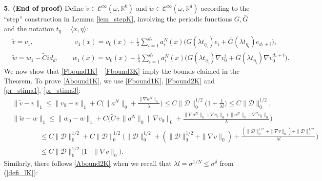 \documentclass[reqno,twoside,11pt]{amsart}
\newcommand{\R}{\mathbb{R}}
\numberwithin{equation}{section}
\theoremstyle{plain}
\theoremstyle{definition}
\begin{document}
\bigskip

{\bf 5. (End of proof)} 
Define $\tilde v\in\mathcal{C}^\infty(\bar\omega,\R^k)$ and
$\tilde w\in\mathcal{C}^\infty(\bar\omega, \R^d)$ according to the ``step''
construction in Lemma \ref{lem_stepK}, involving the periodic functions
$G, \bar G$ and the notation $t_\eta=\langle x, \eta\rangle$:
\begin{equation}\label{vw_finK}
\begin{split}
& \tilde v= v_1, \qquad \qquad\qquad v_1(x)= v_0(x) + 
\frac{1}{\lambda} \sum_{i=1}^{d_*} a_i^N(x)\big(G(\lambda t_{\eta_i})e_i 
+ \bar G(\lambda t_{\eta_i})e_{d_*+i}\big),\\
& \tilde w = w_1-\tilde C id_d, \qquad
w_1(x) = w_{0}(x) - \frac{1}{\lambda} \sum_{i=1}^{d_*}
a_i^N(x)\big(G(\lambda t_{\eta_i})\nabla v^i_0 
+ \bar G(\lambda t_{\eta_i})\nabla v_0^{d_*+i}\big).
\end{split}
\end{equation}
We now show that \ref{Fbound1K} - \ref{Fbound3K} imply the bounds
claimed in the Theorem. To prove \ref{Abound1K}, we use
\ref{Fbound1K}, \ref{Fbound2K} and \ref{pr_stima1}, \ref{pr_stima3}:
\begin{equation*}
\begin{split}
& \|\tilde v - v\|_1\leq \|v_0-v\|_1 + C\Big(\|a^N\|_0+\frac{\|\nabla a^N\|_0}{\lambda}\Big)\leq
C \|\mathcal{D}\|_0^{1/2} \big(1+\frac{1}{\lambda l}\big) \leq C \|\mathcal{D}\|_0^{1/2} ,\\
& \|\tilde w - w\|_1\leq \|w_0-w\|_1 + 
C\Big(\tilde C + \|a^N\|_0\|\nabla v_0\|_0 + \frac{\|\nabla a^N\|_0\|\nabla
  v_0\|_0 + \|a^N\|_0\|\nabla^2 v_0\|_0}{\lambda} \Big) \\
& \qquad \qquad \leq C \|\mathcal{D}\|_0^{1/2} + C \|\mathcal{D}\|_0^{1/2}\Big(\|\mathcal{D}\|_0^{1/2} +
(\|\mathcal{D}\|_0^{1/2}+\|\nabla v\|_0) + 
\frac{(\|\mathcal{D}\|_0^{1/2}+\|\nabla v\|_0) + \|\mathcal{D}\|_0^{1/2}}{\lambda l} \Big)\\
& \qquad \qquad \leq C \|\mathcal{D}\|_0^{1/2} \big(1+ \|\nabla v\|_0\big).
\end{split}
\end{equation*}
Similarly, there follows \ref{Abound2K} when we recall that $\lambda l
= \sigma^{1/N}\leq\sigma^\delta$ from (\ref{defi_lK}):
\end{document}
